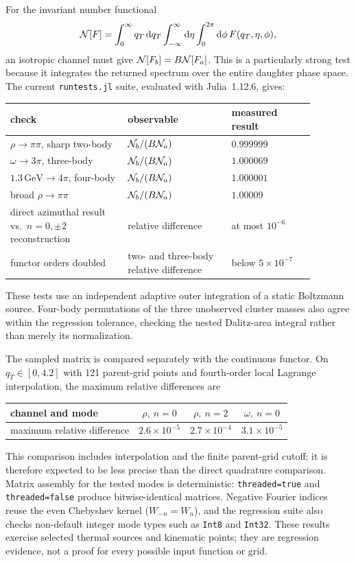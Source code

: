 \documentclass[11pt]{article}
\begin{document}
For the invariant number functional
\begin{equation}
 {\cal N}[F]=\int_0^\infty q_T\,\mathrm{d}q_T
             \int_{-\infty}^{\infty}\mathrm{d}\eta
             \int_0^{2\pi}\mathrm{d}\phi\,F(q_T,\eta,\phi),
 \label{eq:number-functional}
\end{equation}
an isotropic channel must give ${\cal N}[F_b]=B{\cal N}[F_a]$.  This is a
particularly strong test because it integrates the returned spectrum over the
entire daughter phase space.  The current \texttt{runtests.jl} suite, evaluated
with Julia~1.12.6, gives:
\begin{center}
\begin{tabular}{p{0.34\linewidth}p{0.30\linewidth}p{0.24\linewidth}}
\hline
check & observable & measured result \\
\hline
$\rho\to\pi\pi$, sharp two-body
  & ${\cal N}_b/(B{\cal N}_a)$ & $0.999999$ \\
$\omega\to3\pi$, three-body
  & ${\cal N}_b/(B{\cal N}_a)$ & $1.000069$ \\
$1.3\,\mathrm{GeV}\to4\pi$, four-body
  & ${\cal N}_b/(B{\cal N}_a)$ & $1.000001$ \\
broad $\rho\to\pi\pi$
  & ${\cal N}_b/(B{\cal N}_a)$ & $1.00009$ \\
direct azimuthal result vs.\ $n=0,\pm2$ reconstruction
  & relative difference & at most $10^{-6}$ \\
functor orders doubled
  & two- and three-body relative difference & below $5\times10^{-7}$ \\
\hline
\end{tabular}
\end{center}
These tests use an independent adaptive outer integration of a static
Boltzmann source.  Four-body permutations of the three unobserved cluster
masses also agree within the regression tolerance, checking the nested
Dalitz-area integral rather than merely its normalization.

The sampled matrix is compared separately with the continuous functor.  On
$q_T\in[0,4.2]$ with 121 parent-grid points and fourth-order local Lagrange
interpolation, the maximum relative differences are
\begin{center}
\begin{tabular}{lccc}
\hline
channel and mode & $\rho,\ n=0$ & $\rho,\ n=2$ & $\omega,\ n=0$ \\
\hline
maximum relative difference
 & $2.6\times10^{-5}$ & $2.7\times10^{-4}$ & $3.1\times10^{-5}$ \\
\hline
\end{tabular}
\end{center}
This comparison includes interpolation and the finite parent-grid cutoff; it
is therefore expected to be less precise than the direct quadrature
comparison.  Matrix assembly for the tested modes is deterministic:
\texttt{threaded=true} and \texttt{threaded=false} produce bitwise-identical
matrices.  Negative Fourier indices reuse the even Chebyshev kernel
($W_{-n}=W_n$), and the regression suite also checks non-default integer mode
types such as \texttt{Int8} and \texttt{Int32}.  These results exercise selected
thermal sources and kinematic points; they are regression evidence, not a
proof for every possible input function or grid.
\end{document}
